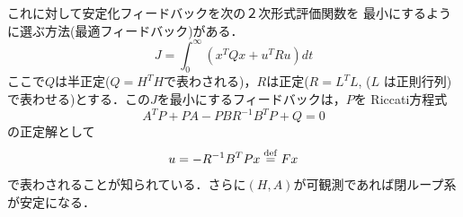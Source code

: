 これに対して安定化フィードバックを次の２次形式評価関数を
最小にするように選ぶ方法(最適フィードバック)がある．
\begin{equation}
 J = \int_{0}^{\infty} (x^T Q x + u^T R u) dt
\label{eqn:P-index}
\end{equation}
ここで$Q$は半正定($Q = H^T H$で表わされる)，$R$は正定($R = L^T L$, ($L$
は正則行列)で表わせる)とする．この$J$を最小にするフィードバックは，$P$を
Riccati方程式
\begin{equation}
 A^T P + P A - P B R^{-1} B^T P + Q = 0
\end{equation}
の正定解として
\begin{equation}
   u = - R^{-1} B^T P x \stackrel{\rm def}{=} Fx
\end{equation}
で表わされることが知られている．さらに$(H,A)$が可観測であれば閉ループ系
が安定になる．

